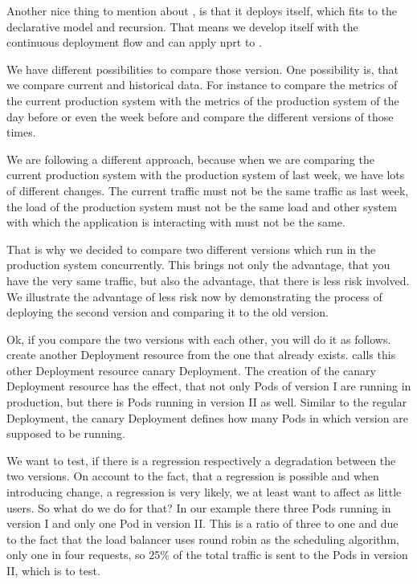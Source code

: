 Another nice thing to mention about \deployer, is that it deploys itself, which fits to the
declarative model and recursion. That means we develop \deployer itself with the continuous
deployment flow and can apply \gls{nprt} to \deployer.

We have different possibilities to compare those version. One possibility is, that we
compare current and historical data. For instance to compare the metrics of the current
production system with the metrics of the production system of the day before or even the
week before and compare the different versions of those times.

We are following a different approach, because when we are comparing the current
production system with the production system of last week, we have lots of different
changes. The current traffic must not be the same traffic as last week, the load of the
production system must not be the same load and other system with which the application is
interacting with must not be the same.

That is why we decided to compare two different versions which run in the production
system concurrently. This brings not only the advantage, that you have the very same
traffic, but also the advantage, that there is less risk involved. We illustrate the
advantage of less risk now by demonstrating the process of deploying the second version
and comparing it to the old version.

Ok, if you compare the two versions with each other, you will do it as follows. \deployer
create another Deployment resource from the one that already exists. \deployer calls this
other Deployment resource canary Deployment. The creation of the canary Deployment
resource has the effect, that not only Pods of version I are running in production, but
there is Pods running in version II as well. Similar to the regular Deployment, the canary
Deployment defines how many Pods in which version are supposed to be running.

We want to test, if there is a regression respectively a degradation between the two
versions. On account to the fact, that a regression is possible and when introducing
change, a regression is very likely, we at least want to affect as little users. So what
do we do for that? In our example there three Pods running in version I and only one Pod
in version II. This is a ratio of three to one and due to the fact that the load balancer
uses round robin as the scheduling algorithm, only one in four requests, so 25\% of the
total traffic is sent to the Pods in version II, which is to test.

